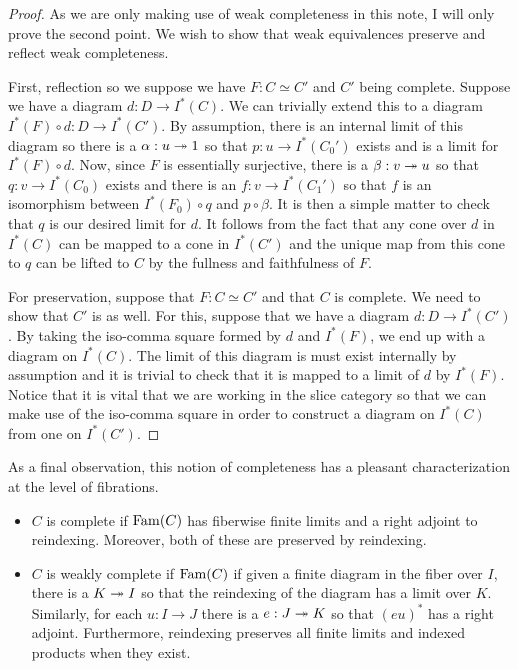 \begin{proof}
  As we are only making use of weak completeness in this note, I will
  only prove the second point. We wish to show that weak equivalences
  preserve and reflect weak completeness.

  First, reflection so we suppose we have $F : C \simeq C'$ and $C'$
  being complete. Suppose we have a diagram $d : D \to I^*(C)$. We can
  trivially extend this to a diagram $I^*(F) \circ d : D \to I^*(C')$.
  By assumption, there is an internal limit of this diagram so there
  is a $\alpha : u \twoheadrightarrow 1$ so that $p : u \to I^*(C_0')$ exists and is
  a limit for $I^*(F) \circ d$. Now, since $F$ is essentially
  surjective, there is a $\beta : v \twoheadrightarrow u$ so that
  $q : v \to I^*(C_0)$ exists and there is an $f : v \to I^*(C_1')$ so
  that $f$ is an isomorphism between $I^*(F_0) \circ q$ and
  $p \circ \beta$. It is then a simple matter to check that $q$ is our
  desired limit for $d$. It follows from the fact that any cone over
  $d$ in $I^*(C)$ can be mapped to a cone in $I^*(C')$ and the unique
  map from this cone to $q$ can be lifted to $C$ by the fullness and
  faithfulness of $F$.

  For preservation, suppose that $F : C \simeq C'$ and that $C$ is
  complete. We need to show that $C'$ is as well. For this, suppose
  that we have a diagram $d : D \to I^*(C')$. By taking the iso-comma
  square formed by $d$ and $I^*(F)$, we end up with a diagram on
  $I^*(C)$. The limit of this diagram is must exist internally by
  assumption and it is trivial to check that it is mapped to a limit
  of $d$ by $I^*(F)$. Notice that it is vital that we are working in
  the slice category so that we can make use of the iso-comma square
  in order to construct a diagram on $I^*(C)$ from one on $I^*(C')$.
\end{proof}
As a final observation, this notion of completeness has a pleasant
characterization at the level of fibrations.
\begin{defn}\label{defn:complete:completefibration}
  \begin{itemize}
  \item $C$ is complete if $\operatorname{Fam}(C)$ has fiberwise finite limits and a
    right adjoint to reindexing. Moreover, both of these are preserved
    by reindexing.
  \item $C$ is weakly complete if $\operatorname{Fam}(C)$ if given a finite
    diagram in the fiber over $I$, there is a $K \twoheadrightarrow I$ so that the
    reindexing of the diagram has a limit over $K$. Similarly, for
    each $u : I \to J$ there is a $e : J \twoheadrightarrow K$ so that $(eu)^*$ has
    a right adjoint. Furthermore, reindexing preserves all finite
    limits and indexed products when they exist.
  \end{itemize}
\end{defn}
